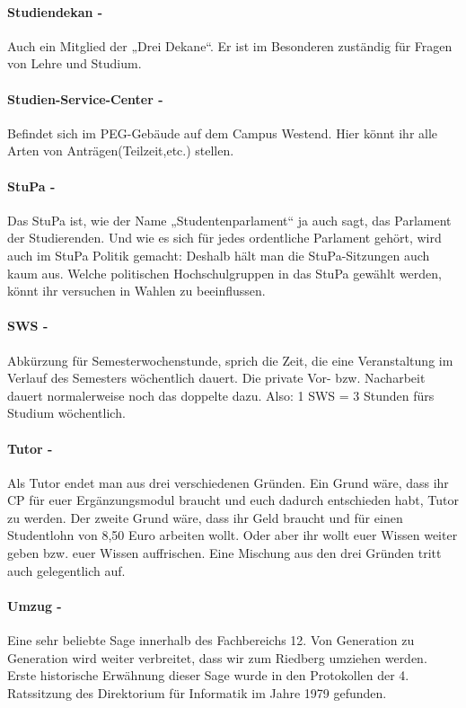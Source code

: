 \paragraph{Studiendekan -} Auch ein Mitglied der „Drei Dekane“. Er ist im Besonderen zuständig für Fragen von Lehre und Studium.
\paragraph{Studien-Service-Center -} Befindet sich im PEG-Gebäude auf dem Campus Westend. Hier könnt ihr alle Arten von Anträgen(Teilzeit,etc.) stellen.
\paragraph{StuPa -} Das StuPa ist, wie der Name „Studentenparlament“ ja auch sagt, das Parlament der Studierenden. Und wie es sich für jedes ordentliche Parlament gehört, wird auch im StuPa Politik gemacht: Deshalb hält man die StuPa-Sitzungen auch kaum aus. Welche politischen Hochschulgruppen in das StuPa gewählt werden, könnt ihr versuchen in Wahlen zu beeinflussen.
\paragraph{SWS -} Abkürzung für Semesterwochenstunde, sprich die Zeit, die eine Veranstaltung im Verlauf des Semesters wöchentlich dauert. Die private Vor- bzw. Nacharbeit dauert normalerweise noch das doppelte dazu. Also: 1 SWS = 3 Stunden fürs Studium wöchentlich.
\paragraph{Tutor -} Als Tutor endet man aus drei verschiedenen Gründen. Ein Grund wäre, dass ihr CP für euer Ergänzungsmodul braucht und euch dadurch entschieden habt, Tutor zu werden. Der zweite Grund wäre, dass ihr Geld braucht und für einen Studentlohn von 8,50 Euro arbeiten wollt. Oder aber ihr wollt euer Wissen weiter geben bzw. euer Wissen auffrischen. Eine Mischung aus den drei Gründen tritt auch gelegentlich auf.
\paragraph{Umzug -} Eine sehr beliebte Sage innerhalb des Fachbereichs 12. Von Generation zu Generation wird weiter verbreitet, dass wir zum Riedberg umziehen werden. Erste historische Erwähnung dieser Sage wurde in den Protokollen der 4. Ratssitzung des Direktorium für Informatik im Jahre 1979 gefunden.
